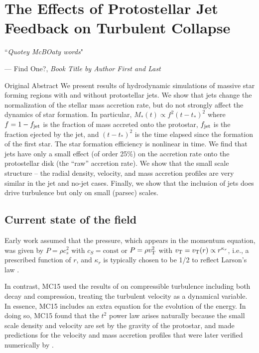 \documentclass[../dissertation.tex]{subfiles}
\begin{document}
\chapter[Jet Feedback in Star Formation]{The Effects of Protostellar Jet Feedback on Turbulent Collapse}
\label{ch:jet}


\singlespace
\epigraph{``\emph{Quotey McBOaty words}"}{--- \textup{Find One?}, \textit{Book Title by Author First and Last}}

\dblspace

Original Abstract
We present results of hydrodynamic simulations of massive star forming regions with and without protostellar jets.
We show that jets change the normalization of the stellar mass accretion rate, but do not strongly affect the dynamics of star formation.
In particular, $M_*(t) \propto f^2 (t-t_*)^2$ where $f = 1 - f_{\rm jet}$ is the fraction of mass accreted onto the protostar, $f_{\rm jet}$ is the fraction ejected by the jet, and $(t-t_*)^2$ is the time elapsed since the formation of the first star.
The star formation efficiency is nonlinear in time.
We find that jets have only a small effect (of order 25\%) on the accretion rate onto the protostellar disk (the ``raw'' accretion rate).
We show that the small scale structure -- the radial density, velocity, and mass accretion profiles are very similar in the jet and no-jet cases.
Finally, we show that the inclusion of jets does drive turbulence but only on small (parsec) scales.


\section{Current state of the field}

Early work \citep{1977ApJ...214..488S,1992ApJ...396..631M,1997ApJ...476..750M} assumed that the pressure, which appears in the momentum equation, was given by $P = \rho c_s^2$ with $c_S = \textrm{const}$ or $P = \rho v_{\rm T}^2$ with $v_{\rm T} = v_{\rm T}(r) \propto r^{\kappa_r}$, i.e., a prescribed function of $r$, and $\kappa_r$ is typically chosen to be 1/2 to reflect Larson's law \citep{1981MNRAS.194..809L}.

In contrast,  MC15 used the results of \citet{2012ApJ...750L..31R} on compressible turbulence including both decay and compression, treating the turbulent velocity as a dynamical variable.  In essence, MC15 includes an extra equation for the evolution of the energy.
In doing so, MC15 found that the $t^2$ power law arises naturally because the small scale density and velocity are set by the gravity of the protostar, and made predictions for the velocity and mass accretion profiles that were later verified numerically by \citet{2017MNRAS.465.1316M}.
\end{document}
